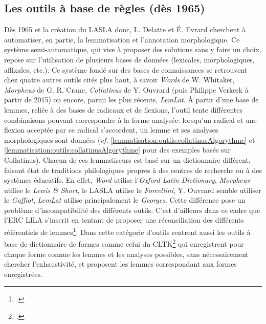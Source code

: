 \subsection{Les outils à base de règles (dès 1965)}

Dès 1965 et la création du LASLA donc, L. Delatte et É. Evrard cherchent à automatiser, en partie, la lemmatisation et l'annotation morphologique. Ce système semi-automatique, qui vise à proposer des solutions sans y faire un choix, repose sur l'utilisation de plusieurs bases de données (lexicales, morphologiques, affixales, etc.). Ce système fondé sur des bases de connaissances se retrouvent chez quatre autres outils cités plus haut, à savoir \textit{Words} de W. Whitaker, \textit{Morpheus} de G. R. Crane, \textit{Collatinus} de Y. Ouvrard (puis Philippe Verkerk à partir de 2015) ou encore, parmi les plus récents, \textit{LemLat}. À partir d'une base de lemmes, reliée à des bases de radicaux et de flexions, l'outil tente différentes combinaisons pouvant correspondre à la forme analysée: lorsqu'un radical et une flexion acceptée par ce radical s'accordent, un lemme et ses analyses morphologiques sont données (\textit{cf.} \ref{lemmatisation:outils:collatinusAlgorythme} et \ref{lemmatisation:outils:collatinusAlgorythme} pour des exemples basés sur Collatinus). Chacun de ces lemmatiseurs est basé sur un dictionnaire différent, faisant état de traditions philologiques propres à des centres de recherche ou à des systèmes éducatifs. En effet, \textit{Word} utilise l'\textit{Oxford Latin Dictionary}, \textit{Morpheus} utilise le \textit{Lewis \& Short}, le LASLA utilise le \textit{Forcellini}, Y. Ouvrard semble utiliser le \textit{Gaffiot}, \textit{LemLat} utilise principalement le \textit{Georges}. Cette différence pose un problème d'incompatibilité des différents outils. C'est d'ailleurs dans ce cadre que l'ERC LILA s'inscrit en tentant de proposer une réconciliation des différents référentiels de lemmes\footcite{mambrini_harmonizing_2019}. Dans cette catégorie d'outils rentrent aussi les outils à base de dictionnaire de formes comme celui du CLTK\footcite{johnson2014cltk} qui enregistrent pour chaque forme connue les lemmes et les analyses possibles, sans nécessairement chercher l'exhaustivité, et proposent les lemmes correspondant aux formes enregistrées.

